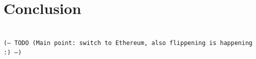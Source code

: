 \documentclass[12pt,journal,compsoc]{IEEEtran}
\newcommand{\code}[1]{\texttt{#1}}
\begin{document}
%





\section{Conclusion}
\\\code{(-- TODO (Main point: switch to Ethereum, also flippening is happening :) --)}



\end{document}

